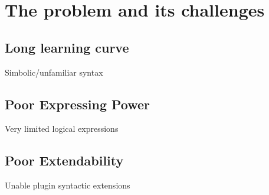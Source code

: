 \chapter{The problem and its challenges}

\section{Long learning curve}

Simbolic/unfamiliar syntax

\section{Poor Expressing Power}

Very limited logical expressions

\section{Poor Extendability}

Unable plugin syntactic extensions